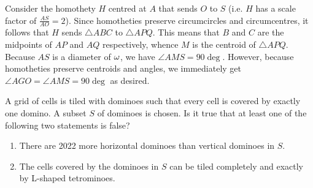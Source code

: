\begin{solution*}
    Consider the homothety $H$ centred at $A$ that sends $O$ to $S$ (i.e. $H$ has a scale factor of $\frac{AS}{AO} = 2$). Since homotheties preserve circumcircles and circumcentres, it follows that $H$ sends $\triangle ABC$ to $\triangle APQ$. This means that $B$ and $C$ are the midpoints of $AP$ and $AQ$ respectively, whence $M$ is the centroid of $\triangle APQ$. Because $AS$ is a diameter of $\omega$, we have $\angle AMS = 90\deg$. However, because homotheties preserve centroids and angles, we immediately get $\angle AGO = \angle AMS = 90\deg$ as desired.
\end{solution*}

\begin{question}[Yes]\label{Q::2023-O-2-2}
    A grid of cells is tiled with dominoes such that every cell is covered by exactly one domino. A subset $S$ of dominoes is chosen. Is it true that at least one of the following two statements is false?
    \begin{enumerate}
        \item There are 2022 more horizontal dominoes than vertical dominoes in $S$.
        \item The cells covered by the dominoes in $S$ can be tiled completely and exactly by L-shaped tetrominoes.
    \end{enumerate}
\end{question}
